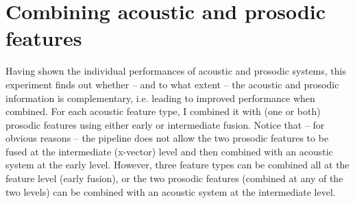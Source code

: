 \documentclass[bsc,frontabs,twoside,singlespacing,parskip,deptreport]{infthesis}
\begin{document}
{{  }

  \section{Combining acoustic and prosodic features}{
    \label{sec:exp-acoustic+prosodic}

    Having shown the individual performances of acoustic and prosodic systems, this experiment finds out whether -- and to what extent -- the acoustic and prosodic information is complementary, i.e. leading to improved performance when combined. For each acoustic feature type, I combined it with (one or both) prosodic features using either early or intermediate fusion. Notice that -- for obvious reasons -- the pipeline does not allow the two prosodic features to be fused at the intermediate (x-vector) level and then combined with an acoustic system at the early level. However, three feature types can be combined all at the feature level (early fusion), or the two prosodic features (combined at any of the two levels) can be combined with an acoustic system at the intermediate level.

}}
\end{document}
